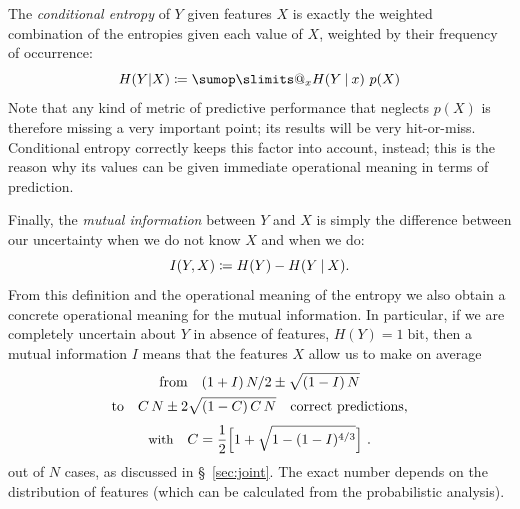 \documentclass[\ifafour a4paper,12pt,\else a5paper,10pt,\fi%
onecolumn,oneside,article,%
british%
]{memoir}
\makeatletter
\theoremstyle{remark}
\theoremstyle{innote}
\def\sum{\DOTSI\sumop\slimits@}
\newcommand*{\de}{\partialup}%
\newcommand*{\defd}{\coloneqq}
\newcommand*{\p}{\mathrm{p}}%
\renewcommand*{\|}[1][]{\nonscript\:#1\vert\nonscript\:\mathopen{}}
\newcommand*{\sect}{\S}%
\newcommand*{\tsum}{\mathop{\textstyle\sum}\nolimits}
\newcommand*{\bit}{\textrm{bit}}
\makeatother
\begin{document}
The \emph{conditional entropy} of $Y$ given features $X$ is exactly the
weighted combination of the entropies given each value of $X$, weighted by
their frequency of occurrence:
\begin{equation}
  \label{eq:cond_entr}
  H(Y|X) \defd \sum_{x} H(Y\|x)\ p(X)
\end{equation}
Note that any kind of metric of predictive performance that neglects $p(X)$
is therefore missing a very important point; its results will be very
hit-or-miss. Conditional entropy correctly keeps this factor into account,
instead; this is the reason why its values can be given immediate
operational meaning in terms of prediction.


Finally, the \emph{mutual information}  between $Y$ and $X$ is simply the
difference between our uncertainty when we do not know $X$ and when we do:
\begin{equation}
  \label{eq:mutualinfo}
  I(Y,X) \defd H(Y) - H(Y\|X).
\end{equation}
From this definition and the operational meaning of the entropy we also
obtain a concrete operational meaning for the mutual information. In
particular, if we are completely uncertain about $Y$ in absence of
features, $H(Y)=1\;\bit$, then a mutual information $I$ means that the
features $X$ allow us to make on average 
\begin{multline}
  \label{eq:entropy_est}
    \text{from}\quad (1+I)\,N/2 \pm \sqrt{(1-I)\,N} \\
    \text{to}\quad   C\,N \pm 2\sqrt{(1-C)\,C\,N}
    \quad \text{correct predictions,}
    \\[1\jot]
    \text{\small with}\quad C = \frac{1}{2}\Bigl[1+\sqrt{1-(1-I)^{4/3}}\Bigr] \ .
\end{multline}
out of $N$ cases, as discussed in \sect~\ref{sec:joint}. The exact number
depends on the distribution of features (which can be calculated from the
probabilistic analysis).




\end{document}
